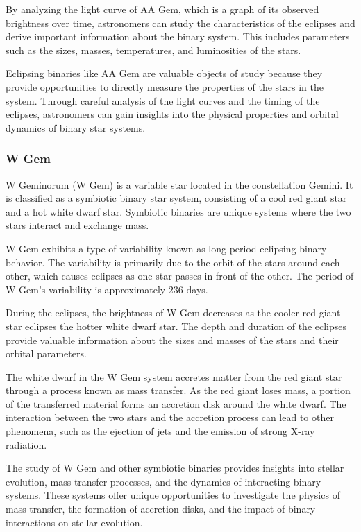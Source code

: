 By analyzing the light curve of AA Gem, which is a graph of its observed brightness over time, astronomers can study the characteristics of the eclipses and derive important information about the binary system. This includes parameters such as the sizes, masses, temperatures, and luminosities of the stars.

Eclipsing binaries like AA Gem are valuable objects of study because they provide opportunities to directly measure the properties of the stars in the system. Through careful analysis of the light curves and the timing of the eclipses, astronomers can gain insights into the physical properties and orbital dynamics of binary star systems.


\subsubsection*{ W Gem }
W Geminorum (W Gem) is a variable star located in the constellation Gemini. It is classified as a symbiotic binary star system, consisting of a cool red giant star and a hot white dwarf star. Symbiotic binaries are unique systems where the two stars interact and exchange mass.

W Gem exhibits a type of variability known as long-period eclipsing binary behavior. The variability is primarily due to the orbit of the stars around each other, which causes eclipses as one star passes in front of the other. The period of W Gem's variability is approximately 236 days.

During the eclipses, the brightness of W Gem decreases as the cooler red giant star eclipses the hotter white dwarf star. The depth and duration of the eclipses provide valuable information about the sizes and masses of the stars and their orbital parameters.

The white dwarf in the W Gem system accretes matter from the red giant star through a process known as mass transfer. As the red giant loses mass, a portion of the transferred material forms an accretion disk around the white dwarf. The interaction between the two stars and the accretion process can lead to other phenomena, such as the ejection of jets and the emission of strong X-ray radiation.

The study of W Gem and other symbiotic binaries provides insights into stellar evolution, mass transfer processes, and the dynamics of interacting binary systems. These systems offer unique opportunities to investigate the physics of mass transfer, the formation of accretion disks, and the impact of binary interactions on stellar evolution.

